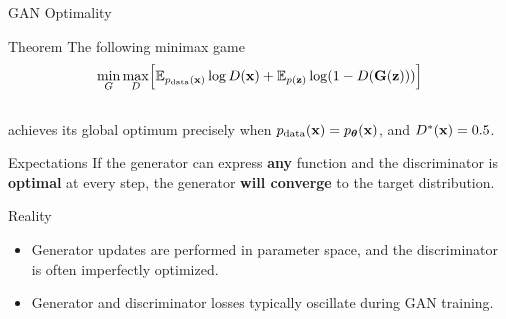 \documentclass{beamer}
\begin{document}
\begin{frame}{GAN Optimality}
	\begin{block}{Theorem}
		The following minimax game 
		\vspace{-0.3cm}
		\[
		\min_{G} \max_D \Bigl[ \mathbb{E}_{p_{\text{data}}(\mathbf{x})} \log D(\mathbf{x}) + \mathbb{E}_{p(\mathbf{z})} \log (1 - D(\mathbf{G}(\mathbf{z}))) \Bigr]
		\]
		\vspace{-0.5cm} \\
		achieves its global optimum precisely when $p_{\text{data}}(\mathbf{x}) = p_{\boldsymbol{\theta}}(\mathbf{x})$, and $D^*(\mathbf{x}) = 0.5$.
	\end{block}
	\vspace{-0.2cm}
	\begin{block}{Expectations}
		If the generator can express \textbf{any} function and the discriminator is \textbf{optimal} at every step, the generator \textbf{will converge} to the target distribution.
	\end{block}
	\eqpause
	\begin{block}{Reality}
		\begin{itemize}
			\item Generator updates are performed in parameter space, and the discriminator is often imperfectly optimized.
			\item Generator and discriminator losses typically oscillate during GAN training.
		\end{itemize}
	\end{block}
\end{frame}
\end{document}

